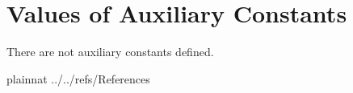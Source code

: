 \documentclass[12pt]{article}
\begin{document}

\section{Values of Auxiliary Constants}

There are not auxiliary constants defined.

%

\newpage

 {plainnat}
 {../../refs/References}

\newpage
\end{document}
